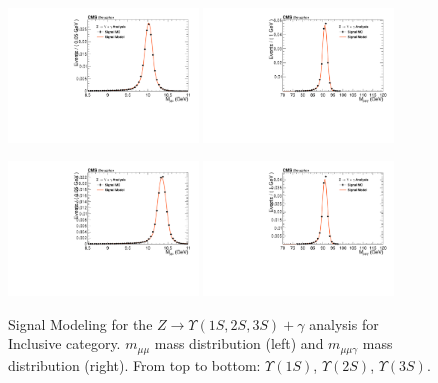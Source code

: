 \begin{figure}[!htbp]
\begin{center}
\includegraphics[width=0.45\textwidth]{figures/fitPlotFiles2D/ZToUpsilonPhotonSignalAndBackgroundFit/mMuMNU_ZToUpsilon2SPhotonSignalAndBackgroundFit_Signal_Cat0}\hspace*{1.cm}
\includegraphics[width=0.45\textwidth]{figures/fitPlotFiles2D/ZToUpsilonPhotonSignalAndBackgroundFit/mHZ_ZToUpsilon2SPhotonSignalAndBackgroundFit_Signal_Cat0_default}\hspace*{1.cm}

\includegraphics[width=0.45\textwidth]{figures/fitPlotFiles2D/ZToUpsilonPhotonSignalAndBackgroundFit/mMuMNU_ZToUpsilon3SPhotonSignalAndBackgroundFit_Signal_Cat0}\hspace*{1.cm}
\includegraphics[width=0.45\textwidth]{figures/fitPlotFiles2D/ZToUpsilonPhotonSignalAndBackgroundFit/mHZ_ZToUpsilon3SPhotonSignalAndBackgroundFit_Signal_Cat0_default}\hspace*{1.cm}


\end{center}\vspace*{-.5cm}
\caption{Signal Modeling for the $Z \rightarrow \Upsilon(1S,2S,3S) +\gamma$ analysis for Inclusive category. $m_{\mu\mu}$ mass distribution (left) and $m_{\mu\mu\gamma}$ mass distribution (right). From top to bottom: $\Upsilon(1S)$, $\Upsilon(2S)$, $\Upsilon(3S)$.}
\label{fig:ZToUpsilon_Signal_Cat0}
\end{figure}

